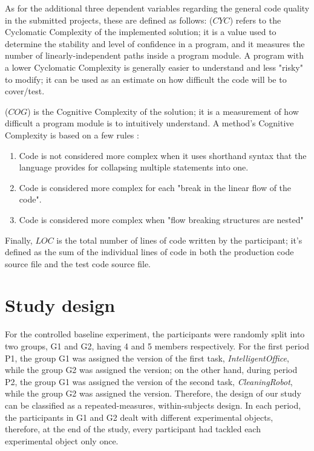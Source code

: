 As for the additional three dependent variables regarding the general code quality in the submitted projects, these are defined as follows:
(\textbf{$CYC$}) refers to the Cyclomatic Complexity of the implemented solution; it is a value used to determine the stability and level of confidence in a program, and it measures the number of linearly-independent paths inside a program module. A program with a lower Cyclomatic Complexity is generally easier to understand and less "risky" to modify; it can be used as an estimate on how difficult the code will be to cover/test.

(\textbf{$COG$}) is the Cognitive Complexity of the solution; it is a measurement of how difficult a program module is to intuitively understand. A method's Cognitive Complexity is based on a few rules \cite{CognitiveComplexity}:
\begin{enumerate}
    \item Code is not considered more complex when it uses shorthand syntax that the language provides for collapsing multiple statements into one.
    \item Code is considered more complex for each "break in the linear flow of the code".
    \item Code is considered more complex when "flow breaking structures are nested"
\end{enumerate}

Finally, $LOC$ is the total number of lines of code written by the participant; it's defined as the sum of the individual lines of code in both the production code source file and the test code source file.



\section{Study design}
For the controlled baseline experiment, the participants were randomly split into two groups, G1 and G2, having 4 and 5 members respectively. For the first period P1, the group G1 was assigned the \tdd version of the first task, \textit{IntelligentOffice}, while the group G2 was assigned the \notdd version; on the other hand, during period P2, the group G1 was assigned the \notdd version of the second task, \textit{CleaningRobot}, while the group G2 was assigned the \tdd version.
Therefore, the design of our study can be classified as a repeated-measures, within-subjects design. In each period, the participants in G1 and G2 dealt with different experimental objects, therefore, at the end of the study, every participant had tackled each experimental object only once.

